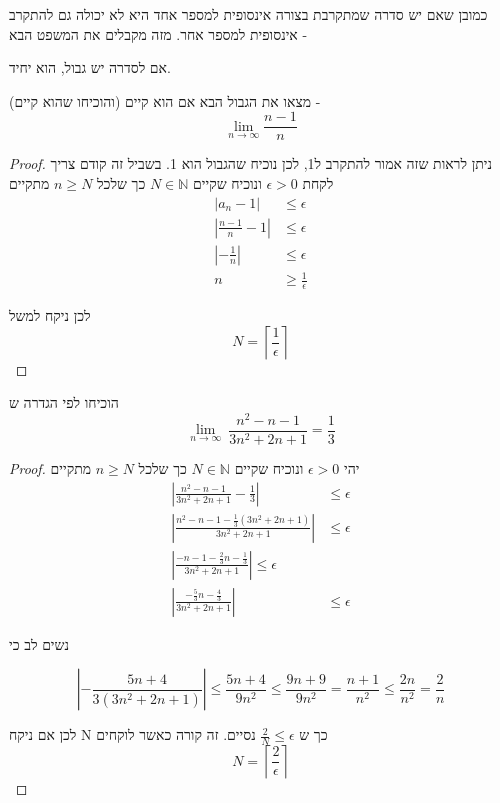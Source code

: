 \documentclass{article}
\begin{document}
כמובן שאם יש סדרה שמתקרבת בצורה אינסופית למספר אחד היא לא יכולה גם להתקרב אינסופית למספר אחר. מזה מקבלים את המשפט הבא - 

\begin{theorem}
אם לסדרה יש גבול, הוא יחיד.
\end{theorem}

\begin{exercise}
מצאו את הגבול הבא אם הוא קיים (והוכיחו שהוא קיים) - 
\[\underset{n\rightarrow\infty}{\lim} \frac{n-1}{n}\]
\end{exercise}

\begin{proof}
ניתן לראות שזה אמור להתקרב ל1, לכן נוכיח שהגבול הוא 1. בשביל זה קודם צריך לקחת 
$\epsilon>0$ 
ונוכיח שקיים 
$N\in\mathbb{N}$
כך שלכל 
$n\geq N$
מתקיים 
\begin{align*}
|a_n-1|&\leq \epsilon \\
\left|\frac{n-1}{n} - 1\right|&\leq\epsilon \\
\left|-\frac{1}{n}\right| &\leq \epsilon\\
n&\geq\frac{1}{\epsilon} 
\end{align*}

לכן ניקח למשל 
\[ N = \left\lceil\frac{1}{\epsilon}\right\rceil\]

\end{proof}

\begin{exercise}
הוכיחו לפי הגדרה ש
\[\underset{n\rightarrow\infty}{\lim}\:\frac{n^2-n-1}{3n^2+2n+1} = \frac{1}{3}\]
\end{exercise}

\begin{proof}
יהי 
$\epsilon>0$
ונוכיח שקיים 
$N\in\mathbb{N}$
כך שלכל 
$n\geq N$ 
מתקיים 
\begin{align*}
\left|\frac{n^2-n-1}{3n^2+2n+1} - \frac{1}{3}\right|&\leq\epsilon\\
\left| \frac{n^2-n-1-\frac{1}{3}(3n^2+2n+1)}{3n^2+2n+1} \right|&\leq \epsilon\\
\left|\frac{-n-1-\frac{2}{3}n-\frac{1}{3}}{3n^2+2n+1}\right|\leq\epsilon \\
\left|\frac{-\frac{5}{3}n -\frac{4}{3}}{3n^2+2n+1}\right|&\leq\epsilon
\end{align*}

נשים לב כי

\[\left|-\frac{5n+4}{3(3n^2+2n+1)}\right| \leq \frac{5n+4}{9n^2} \leq \frac{9n+9}{9n^2} = \frac{n+1}{n^2}\leq \frac{2n}{n^2} = \frac{2}{n}\]

לכן אם ניקח N כך ש 
$\frac{2}{N} \leq \epsilon$
נסיים. זה קורה כאשר לוקחים 
\[N=\left\lceil\frac{2}{\epsilon}\right\rceil\]
\end{proof}
\end{document}
